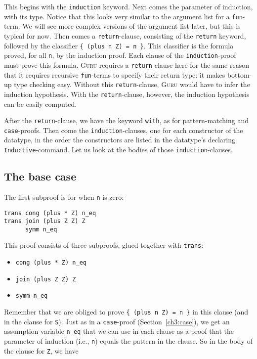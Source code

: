 \documentclass{book}[12pt]
\newcommand{\guru}[0]{\textsc{Guru}\xspace}
\begin{document}
\noindent This begins with the \texttt{induction} keyword.  Next comes
the parameter of induction, with its type.  Notice that this looks
very similar to the argument list for a \texttt{fun}-term.  We will
see more complex versions of the argument list later, but this is
typical for now.  Then comes a \texttt{return}-clause, consisting of
the \texttt{return} keyword, followed by the classifier \texttt{\{
(plus n Z) = n \}}.  This classifier is the formula proved, for all
\texttt{n}, by the induction proof.  Each clause of the
\texttt{induction}-proof must prove this formula.  \guru requires a
\texttt{return}-clause here for the same reason that it requires
recursive \texttt{fun}-terms to specify their return type: it makes
bottom-up type checking easy.  Without this \texttt{return}-clause,
\guru would have to infer the induction hypothesis.  With the
\texttt{return}-clause, however, the induction hypothesis can be
easily computed.

After the \texttt{return}-clause, we have the keyword \texttt{with},
as for pattern-matching and \texttt{case}-proofs.  Then come the
\texttt{induction}-clauses, one for each constructor of the datatype,
in the order the constructors are listed in the datatype's declaring
\texttt{Inductive}-command.  Let us look at the bodies of those
\texttt{induction}-clauses.

\subsection{The base case}

The first subproof is for when \texttt{n} is zero:

\begin{verbatim}
trans cong (plus * Z) n_eq
trans join (plus Z Z) Z
      symm n_eq
\end{verbatim}

\noindent This proof consists of three subproofs, glued together with \texttt{trans}:

\begin{itemize}
\item \texttt{cong (plus * Z) n\_eq}
\item \texttt{join (plus Z Z) Z}
\item \texttt{symm n\_eq}
\end{itemize}

\noindent Remember that we are obliged to prove \texttt{\{ (plus n Z)
= n \}} in this clause (and in the clause for \texttt{S}).  Just as in
a \texttt{case}-proof (Section~\ref{ch3:case}), we get an assumption
variable \texttt{n\_eq} that we can use in each clause as a proof that
the parameter of induction (i.e., \texttt{n}) equals the pattern in
the clause.  So in the body of the clause for \texttt{Z}, we have
\end{document}
